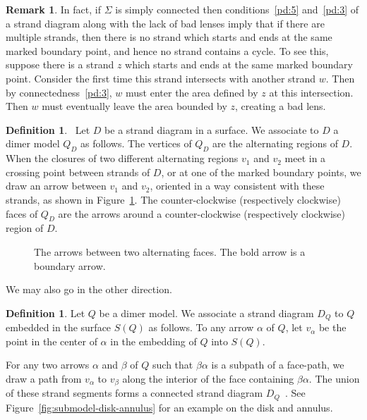 \documentclass{article}
\theoremstyle{definition}
\newtheorem{defn}[thm]{Definition}
\newtheorem{remk}[thm]{Remark}
\begin{document}
\begin{remk}
	In fact, if $\Sigma$ is simply connected then conditions~\eqref{pd:5} and~\eqref{pd:3} of a strand diagram along with the lack of bad lenses imply that if there are multiple strands, then there is no strand which starts and ends at the same marked boundary point, and hence no strand contains a cycle. 
	To see this, suppose there is a strand $z$ which starts and ends at the same marked boundary point. Consider the first time this strand intersects with another strand $w$. Then by connectedness~\eqref{pd:3}, $w$ must enter the area defined by $z$ at this intersection. Then $w$ must eventually leave the area bounded by $z$, creating a bad lens.
\end{remk}
	





\begin{defn}~\label{defn:dimer-model-from-strand-diagram}
	Let $D$ be a strand diagram in a surface. We associate to $D$ a dimer model $Q_D$ as follows. The vertices of $Q_D$ are the alternating regions of $D$. When the closures of two different alternating regions $v_1$ and $v_2$ meet in a crossing point between strands of $D$, or at one of the marked boundary points, we draw an arrow between $v_1$ and $v_2$, oriented in a way consistent with these strands, as shown in Figure~\ref{fig:strand-arrows}. 
	The counter-clockwise (respectively clockwise) faces of $Q_D$ are the arrows around a counter-clockwise (respectively clockwise) region of $D$.
	\def\svgwidth{200pt}
	\begin{figure}		\centering
		
		\caption{The arrows between two alternating faces. The bold arrow is a boundary arrow.}
		\label{fig:strand-arrows}
	\end{figure}
\end{defn}

We may also go in the other direction.

\begin{defn}\label{defn:strand-diagram-from-dimer-model}
	Let $Q$ be a dimer model. We associate a strand diagram $D_Q$ to $Q$ embedded in the surface $S(Q)$ as follows.
	To any arrow $\alpha$ of $Q$, let $v_\alpha$ be the point in the center of $\alpha$ in the embedding of $Q$ into $S(Q)$. 



	For any two arrows $\alpha$ and $\beta$ of $Q$ such that $\beta\alpha$ is a subpath of a face-path, we draw a path from $v_\alpha$ to $v_\beta$ along the interior of the face containing $\beta\alpha$. 
	The union of these strand segments forms a connected strand diagram $D_Q$~\cite[\S0.4 -- 0.5]{XBocklandt2015}. See Figure~\ref{fig:submodel-disk-annulus} for an example on the disk and annulus.
    
\end{defn}
\end{document}
